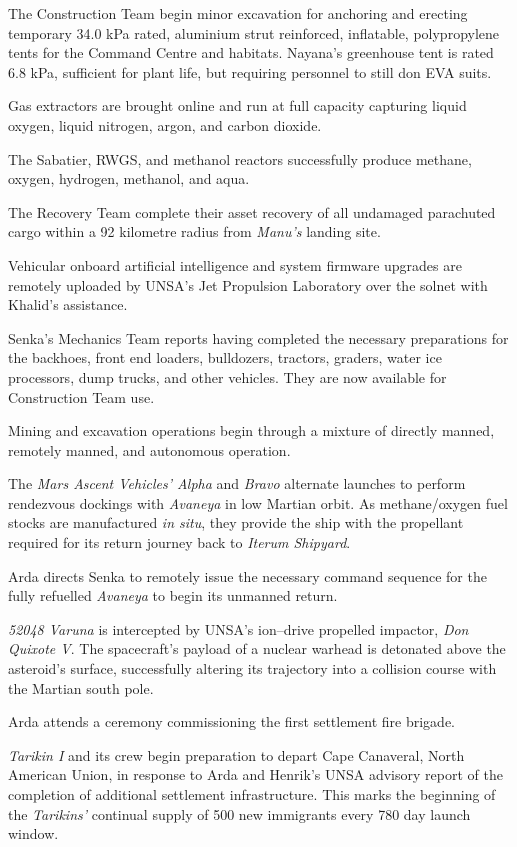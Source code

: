 The Construction Team begin minor excavation for anchoring and erecting temporary 34.0 kPa rated, aluminium strut reinforced, inflatable, polypropylene tents for the Command Centre and habitats. Nayana's greenhouse tent is rated 6.8 kPa, sufficient for plant life, but requiring personnel to still don EVA suits.
\StopTimelineDate

Gas extractors are brought online and run at full capacity capturing liquid oxygen, liquid nitrogen, argon, and carbon dioxide. 

The Sabatier, RWGS, and methanol reactors successfully produce methane, oxygen, hydrogen, methanol, and aqua.
\StopTimelineDate

The Recovery Team complete their asset recovery of all undamaged parachuted cargo within a 92 kilometre radius from {\it Manu's} landing site.
\StopTimelineDate

Vehicular onboard artificial intelligence and system firmware upgrades are remotely uploaded by UNSA's Jet Propulsion Laboratory over the solnet with Khalid's assistance.

Senka's Mechanics Team reports having completed the necessary preparations for the backhoes, front end loaders, bulldozers, tractors, graders, water ice processors, dump trucks, and other vehicles. They are now available for Construction Team use.

Mining and excavation operations begin through a mixture of directly manned, remotely manned, and autonomous operation.
\StopTimelineDate

The {\it Mars Ascent Vehicles' Alpha} and {\it Bravo} alternate launches to perform rendezvous dockings with {\it Avaneya} in low Martian orbit. As methane/oxygen fuel stocks are manufactured {\it in situ}, they provide the ship with the propellant required for its return journey back to {\it Iterum Shipyard}.
\StopTimelineDate

Arda directs Senka to remotely issue the necessary command sequence for the fully refuelled {\it Avaneya} to begin its unmanned return.
\StopTimelineDate

{\it 52048 Varuna} is intercepted by UNSA's ion--drive propelled impactor, {\it Don Quixote V}. The spacecraft's payload of a nuclear warhead is detonated above the asteroid's surface, successfully altering its trajectory into a collision course with the Martian south pole.
\StopTimelineDate

Arda attends a ceremony commissioning the first settlement fire brigade.
\StopTimelineDate

{\it Tarikin I} and its crew begin preparation to depart Cape Canaveral, North American Union, in response to Arda and Henrik's UNSA advisory report of the completion of additional settlement infrastructure. This marks the beginning of the {\it Tarikins'} continual supply of 500 new immigrants every 780 day launch window.
\StopTimelineDate

